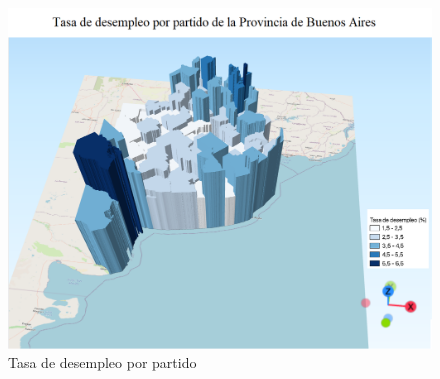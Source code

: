 \documentclass[12pt]{article}
\begin{document}
\begin{figure}
    \centering
    \includegraphics[width = \textwidth]{mapas/Pcia_BsAs_Desempleo.png}   
    \caption{Tasa de desempleo por partido}
    \label{bsasundemp}
\end{figure}







\end{document}
